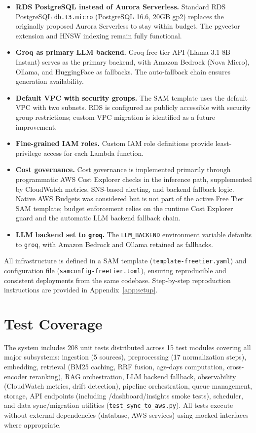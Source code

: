 \begin{itemize}[leftmargin=0.5in]
  \item \textbf{RDS PostgreSQL instead of Aurora Serverless.} Standard RDS PostgreSQL \texttt{db.t3.micro} (PostgreSQL 16.6, 20GB gp2) replaces the originally proposed Aurora Serverless to stay within budget. The pgvector extension and HNSW indexing remain fully functional.
  \item \textbf{Groq as primary LLM backend.} Groq free-tier API (Llama 3.1 8B Instant) serves as the primary backend, with Amazon Bedrock (Nova Micro), Ollama, and HuggingFace as fallbacks. The auto-fallback chain ensures generation availability.
  \item \textbf{Default VPC with security groups.} The SAM template uses the default VPC with two subnets. RDS is configured as publicly accessible with security group restrictions; custom VPC migration is identified as a future improvement.
  \item \textbf{Fine-grained IAM roles.} Custom IAM role definitions provide least-privilege access for each Lambda function.
  \item \textbf{Cost governance.} Cost governance is implemented primarily through programmatic AWS Cost Explorer checks in the inference path, supplemented by CloudWatch metrics, SNS-based alerting, and backend fallback logic. Native AWS Budgets was considered but is not part of the active Free Tier SAM template; budget enforcement relies on the runtime Cost Explorer guard and the automatic LLM backend fallback chain.
  \item \textbf{LLM backend set to \texttt{groq}.} The \texttt{LLM\_BACKEND} environment variable defaults to \texttt{groq}, with Amazon Bedrock and Ollama retained as fallbacks.
\end{itemize}

All infrastructure is defined in a SAM template (\texttt{template-freetier.yaml}) and configuration file (\texttt{samconfig-freetier.toml}), ensuring reproducible and consistent deployments from the same codebase. Step-by-step reproduction instructions are provided in Appendix~\ref{app:setup}.

\section{Test Coverage}
\label{sec:tests}

The system includes 208 unit tests distributed across 15 test modules covering all major subsystems: ingestion (5 sources), preprocessing (17 normalization steps), embedding, retrieval (BM25 caching, RRF fusion, age-days computation, cross-encoder reranking), RAG orchestration, LLM backend fallback, observability (CloudWatch metrics, drift detection), pipeline orchestration, queue management, storage, API endpoints (including /dashboard/insights smoke tests), scheduler, and data sync/migration utilities (\texttt{test\_sync\_to\_aws.py}). All tests execute without external dependencies (database, AWS services) using mocked interfaces where appropriate.

